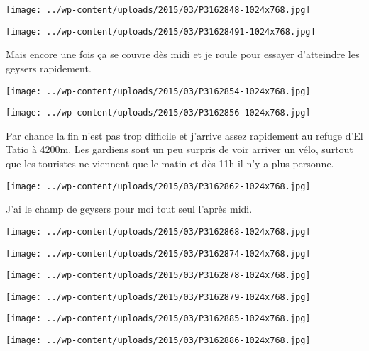 \centerline{\texttt{[image: ../wp-content/uploads/2015/03/P3162848-1024x768.jpg]} } 
 \newline
 \newline
\centerline{\texttt{[image: ../wp-content/uploads/2015/03/P31628491-1024x768.jpg]} } 
Mais encore une fois ça se couvre dès midi et je roule pour essayer d'atteindre les geysers rapidement. \newline
 \newline
\centerline{\texttt{[image: ../wp-content/uploads/2015/03/P3162854-1024x768.jpg]} } 
 \newline
 \newline
\centerline{\texttt{[image: ../wp-content/uploads/2015/03/P3162856-1024x768.jpg]} } 
 \newline
 Par chance la fin n'est pas trop difficile et j'arrive assez rapidement au refuge d'El Tatio à 4200m. \newline
 Les gardiens sont un peu surpris de voir arriver un vélo, surtout que les touristes ne viennent que le matin et dès 11h il n'y a plus personne. \newline
 \newline
\centerline{\texttt{[image: ../wp-content/uploads/2015/03/P3162862-1024x768.jpg]} } 
 \newline
 J'ai le champ de geysers pour moi tout seul l'après midi. \newline
 \newline
\centerline{\texttt{[image: ../wp-content/uploads/2015/03/P3162868-1024x768.jpg]} } 
 \newline
 \newline
\centerline{\texttt{[image: ../wp-content/uploads/2015/03/P3162874-1024x768.jpg]} } 
 \newline
 \newline
\centerline{\texttt{[image: ../wp-content/uploads/2015/03/P3162878-1024x768.jpg]} } 
 \newline
 \newline
\centerline{\texttt{[image: ../wp-content/uploads/2015/03/P3162879-1024x768.jpg]} } 
 \newline
 \newline
\centerline{\texttt{[image: ../wp-content/uploads/2015/03/P3162885-1024x768.jpg]} } 
 \newline
 \newline
\centerline{\texttt{[image: ../wp-content/uploads/2015/03/P3162886-1024x768.jpg]} } 
